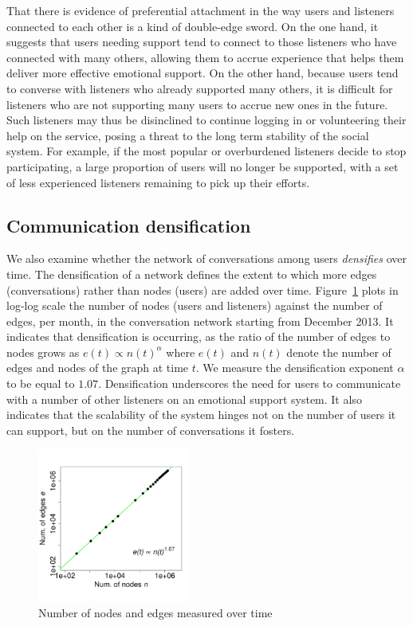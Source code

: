 That there is evidence of preferential attachment in the way users and listeners 
connected to each other is a kind of double-edge sword. On the one hand, it suggests that
users needing support tend to connect to those listeners who have connected with
many others, allowing them to accrue experience that helps them deliver more
effective emotional support. On the other hand, because users tend to converse with listeners
who already supported many others, it is difficult for listeners who are not supporting
many users to accrue new ones in the future. Such listeners may thus be disinclined 
to continue logging in or volunteering their help on the service,  posing
a threat to the long term stability of the social system. For example, if the 
most popular or overburdened listeners  decide to stop participating, a large 
proportion of users will no longer be supported, with a set of less experienced 
listeners remaining to pick up their efforts. 

\subsection{Communication densification}
We also examine whether the network of conversations among users
{\em densifies} over time. The densification of a network defines the
extent to which more edges (conversations) rather than nodes (users) 
are added over time. Figure~\ref{log-node-edge} 
plots in log-log scale the number of nodes (users and listeners) against the
number of edges, per month, in the conversation network starting 
from December 2013. It indicates that densification is occurring, as the 
ratio of the number of edges to nodes grows as
$e(t) \propto n(t)^\alpha $ where $ e(t) $ and $ n(t)$ denote the number of
edges and nodes of the graph at time $t$. We measure the densification exponent 
$\alpha$ to be equal to $1.07$. 
Densification underscores the need for users to communicate with a number of other 
listeners on an emotional support system. It also indicates that the scalability of the 
system hinges not on the number of users it can support, but on the number of conversations 
it fosters. 

\begin{figure}[htb]
\centering
\includegraphics[width=0.45\textwidth]{densification.pdf}
\caption{Number of nodes and edges measured over time}
\label{log-node-edge}
\end{figure}

